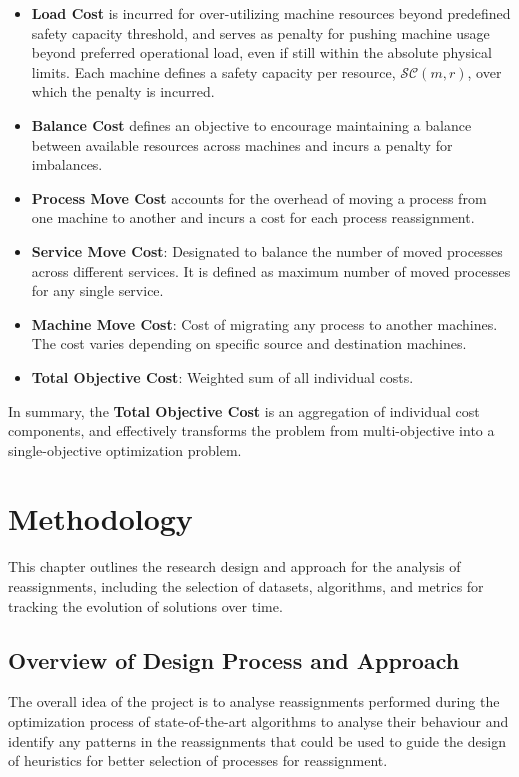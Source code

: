 \documentclass[a4paper,12pt]{Classes/RoboticsLaTeX}
\begin{document}
\begin{itemize}
\item
  \textbf{Load Cost} is incurred for over-utilizing machine resources beyond predefined safety capacity threshold, and serves as penalty for pushing machine usage beyond preferred operational load, even if still within the absolute physical limits. Each machine defines a safety capacity per resource, \(\mathcal{SC} (\textit{m}, \textit{r})\), over which the penalty is incurred.
\item
  \textbf{Balance Cost} defines an objective to encourage maintaining a balance between available resources across machines and incurs a penalty for imbalances.
\item
  \textbf{Process Move Cost} accounts for the overhead of moving a process from one machine to another and incurs a cost for each process reassignment.
\item
  \textbf{Service Move Cost}: Designated to balance the number of moved processes across different services. It is defined as maximum number of moved processes for any single service.
\item
  \textbf{Machine Move Cost}: Cost of migrating any process to another machines. The cost varies depending on specific source and destination machines.
\item
  \textbf{Total Objective Cost}: Weighted sum of all individual costs.
\end{itemize}

In summary, the \textbf{Total Objective Cost} is an aggregation of individual cost components, and effectively transforms the problem from multi-objective into a single-objective optimization problem.


\chapter{Methodology} \label{chap:methodology} 

This chapter outlines the research design and approach for the analysis of reassignments, including the selection of datasets, algorithms, and metrics for tracking the evolution of solutions over time.

\section{Overview of Design Process and Approach}

The overall idea of the project is to analyse reassignments performed during the optimization process of state-of-the-art algorithms to analyse their behaviour and identify any patterns in the reassignments that could be used to guide the design of heuristics for better selection of processes for reassignment. 
\end{document}
